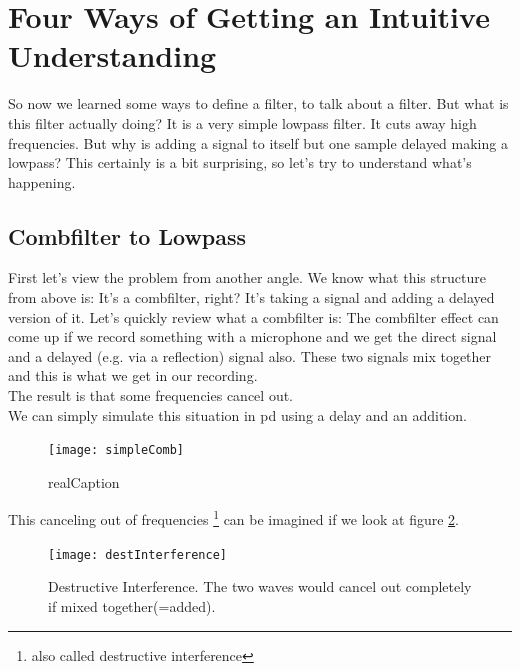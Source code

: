     


\section{Four Ways of Getting an Intuitive Understanding}

So now we learned some ways to define a filter, to talk about a filter. But what is this filter actually doing? It is a very simple lowpass filter. It cuts away high frequencies. But why is adding a signal to itself but one sample delayed making a lowpass? This certainly is a bit surprising, so let's try to understand what's happening.

\subsection{Combfilter to Lowpass}
First let's view the problem from another angle. We know what this structure from above is: It's a combfilter, right? It's taking a signal and adding a delayed version of it. Let's quickly review what a combfilter is:
The combfilter effect can come up if we record something with a microphone and we get the direct signal and a delayed (e.g. via a reflection) signal also. These two signals mix together and this is what we get in our recording.\\
The result is that some frequencies cancel out.\\
We can simply simulate this situation in pd using a delay and an addition. 

\begin{figure}[H]
	\centering
	\texttt{[image: simpleComb]}
	\caption[shortCaption]
	{realCaption}
	\label{fig:label}
\end{figure}

This canceling out of frequencies \footnote{also called destructive interference} can be imagined if we look at figure \ref{fig:destIntereference}. 
\begin{figure}[H]
	\centering
	\texttt{[image: destInterference]}
	\caption[Destructive Interference]
	{Destructive Interference. The two waves would cancel out completely if mixed together(=added).}
	\label{fig:destIntereference}
\end{figure}

